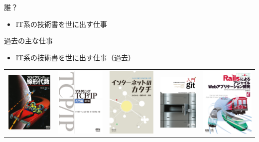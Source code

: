 
\begin{frame}[t]{\inhibitglue 誰？}
  \sffamily

  \begin{itemize}
    \item IT系の技術書を世に出す仕事
  \end{itemize}

\end{frame}

\begin{frame}[t]{\inhibitglue 過去の主な仕事}
  \sffamily

  \begin{itemize}
    \item IT系の技術書を世に出す仕事（過去）
  \end{itemize}

  \begin{tabular}{c c c c c}
    \includegraphics[width=.17\textwidth]{images/4-274-06578-2.jpg}     &
    \includegraphics[width=.17\textwidth]{images/978-4-274-06876-8.jpg} &
    \includegraphics[width=.15\textwidth]{images/978-4-274-06824-9.jpg} &
    \includegraphics[width=.15\textwidth]{images/978-4-274-06767-9.jpg} &
    \includegraphics[width=.17\textwidth]{images/978-4-274-06866-9.jpg} \\

\end{tabular}
\end{frame}
